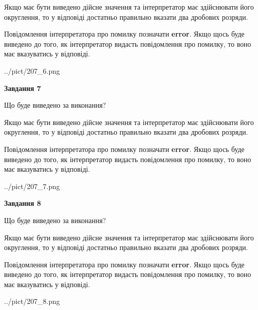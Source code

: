 \documentclass[12pt, ukrainian]{article}
\begin{document}
{\begin {Large}
Якщо має бути виведено дійсне значення та інтерпретатор має здійснювати його округлення, 
то у відповіді достатньо правильно вказати два дробових розряди.

Повідомлення інтерпретатора про помилку позначати \textbf{error}.
Якщо щось буде виведено до того, як інтерпретатор видасть повідомлення про помилку, 
то воно має вказуватись у відповіді. \par

\begin{center}
	{../pict/207_6.png}
\end{center}
\newpage

{\begin {center}\textbf{Завдання 7}\end {center}}\par
Що буде виведено за виконання? \par

Якщо має бути виведено дійсне значення та інтерпретатор має здійснювати його округлення, 
то у відповіді достатньо правильно вказати два дробових розряди.

Повідомлення інтерпретатора про помилку позначати \textbf{error}.
Якщо щось буде виведено до того, як інтерпретатор видасть повідомлення про помилку, 
то воно має вказуватись у відповіді. \par

\begin{center}
	{../pict/207_7.png}
\end{center}
\newpage

{\begin {center}\textbf{Завдання 8}\end {center}}\par
Що буде виведено за виконання? \par

Якщо має бути виведено дійсне значення та інтерпретатор має здійснювати його округлення, 
то у відповіді достатньо правильно вказати два дробових розряди.

Повідомлення інтерпретатора про помилку позначати \textbf{error}.
Якщо щось буде виведено до того, як інтерпретатор видасть повідомлення про помилку, 
то воно має вказуватись у відповіді. \par

\begin{center}
	{../pict/207_8.png}
\end{center}
\newpage


\end{Large}}
\end{document}
